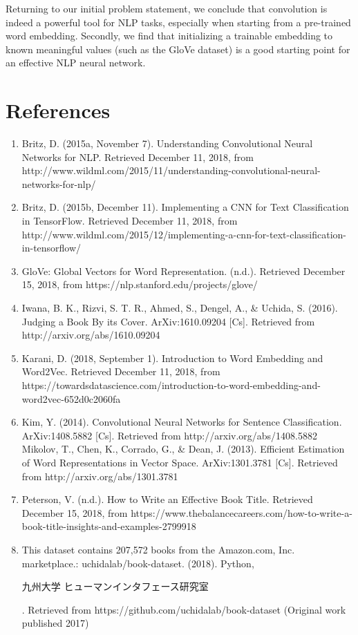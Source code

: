 \documentclass[jou,apacite, 10px]{apa6}
\begin{document}
 Returning to our initial problem statement, we conclude that convolution is indeed a powerful tool for NLP tasks, especially when starting from a pre-trained word embedding. Secondly, we find that initializing a trainable embedding to known meaningful values (such as the GloVe dataset) is a good starting point for an effective NLP neural network.

\section{References}
\begin{enumerate}[(1)]
\item Britz, D. (2015a, November 7). Understanding Convolutional Neural Networks for NLP. Retrieved December 11, 2018, from http://www.wildml.com/2015/11/understanding-convolutional-neural-networks-for-nlp/
\item Britz, D. (2015b, December 11). Implementing a CNN for Text Classification in TensorFlow. Retrieved December 11, 2018, from http://www.wildml.com/2015/12/implementing-a-cnn-for-text-classification-in-tensorflow/
\item GloVe: Global Vectors for Word Representation. (n.d.). Retrieved December 15, 2018, from https://nlp.stanford.edu/projects/glove/
\item Iwana, B. K., Rizvi, S. T. R., Ahmed, S., Dengel, A., \& Uchida, S. (2016). Judging a Book By its Cover. ArXiv:1610.09204 [Cs]. Retrieved from http://arxiv.org/abs/1610.09204
\item Karani, D. (2018, September 1). Introduction to Word Embedding and Word2Vec. Retrieved December 11, 2018, from https://towardsdatascience.com/introduction-to-word-embedding-and-word2vec-652d0c2060fa
\item Kim, Y. (2014). Convolutional Neural Networks for Sentence Classification. ArXiv:1408.5882 [Cs]. Retrieved from http://arxiv.org/abs/1408.5882
Mikolov, T., Chen, K., Corrado, G., \& Dean, J. (2013). Efficient Estimation of Word Representations in Vector Space. ArXiv:1301.3781 [Cs]. Retrieved from http://arxiv.org/abs/1301.3781
\item Peterson, V. (n.d.). How to Write an Effective Book Title. Retrieved December 15, 2018, from https://www.thebalancecareers.com/how-to-write-a-book-title-insights-and-examples-2799918
\item This dataset contains 207,572 books from the Amazon.com, Inc. marketplace.: uchidalab/book-dataset. (2018). Python, \begin{CJK}{UTF8}{min}九州大学 ヒューマンインタフェース研究室\end{CJK}. Retrieved from https://github.com/uchidalab/book-dataset (Original work published 2017)

\end{enumerate}
\end{document}
